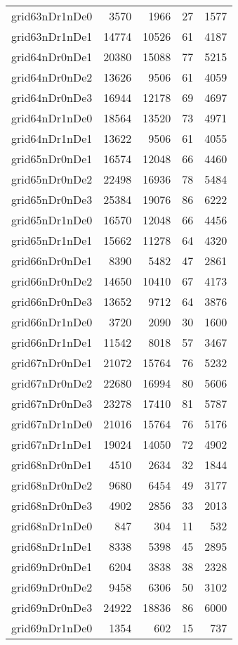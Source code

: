\begin{tabular}{lrrrr}
grid63nDr1nDe0 & 3570 & 1966 & 27 & 1577 \\
grid63nDr1nDe1 & 14774 & 10526 & 61 & 4187 \\
grid64nDr0nDe1 & 20380 & 15088 & 77 & 5215 \\
grid64nDr0nDe2 & 13626 & 9506 & 61 & 4059 \\
grid64nDr0nDe3 & 16944 & 12178 & 69 & 4697 \\
grid64nDr1nDe0 & 18564 & 13520 & 73 & 4971 \\
grid64nDr1nDe1 & 13622 & 9506 & 61 & 4055 \\
grid65nDr0nDe1 & 16574 & 12048 & 66 & 4460 \\
grid65nDr0nDe2 & 22498 & 16936 & 78 & 5484 \\
grid65nDr0nDe3 & 25384 & 19076 & 86 & 6222 \\
grid65nDr1nDe0 & 16570 & 12048 & 66 & 4456 \\
grid65nDr1nDe1 & 15662 & 11278 & 64 & 4320 \\
grid66nDr0nDe1 & 8390 & 5482 & 47 & 2861 \\
grid66nDr0nDe2 & 14650 & 10410 & 67 & 4173 \\
grid66nDr0nDe3 & 13652 & 9712 & 64 & 3876 \\
grid66nDr1nDe0 & 3720 & 2090 & 30 & 1600 \\
grid66nDr1nDe1 & 11542 & 8018 & 57 & 3467 \\
grid67nDr0nDe1 & 21072 & 15764 & 76 & 5232 \\
grid67nDr0nDe2 & 22680 & 16994 & 80 & 5606 \\
grid67nDr0nDe3 & 23278 & 17410 & 81 & 5787 \\
grid67nDr1nDe0 & 21016 & 15764 & 76 & 5176 \\
grid67nDr1nDe1 & 19024 & 14050 & 72 & 4902 \\
grid68nDr0nDe1 & 4510 & 2634 & 32 & 1844 \\
grid68nDr0nDe2 & 9680 & 6454 & 49 & 3177 \\
grid68nDr0nDe3 & 4902 & 2856 & 33 & 2013 \\
grid68nDr1nDe0 & 847 & 304 & 11 & 532 \\
grid68nDr1nDe1 & 8338 & 5398 & 45 & 2895 \\
grid69nDr0nDe1 & 6204 & 3838 & 38 & 2328 \\
grid69nDr0nDe2 & 9458 & 6306 & 50 & 3102 \\
grid69nDr0nDe3 & 24922 & 18836 & 86 & 6000 \\
grid69nDr1nDe0 & 1354 & 602 & 15 & 737 \\

\end{tabular}
